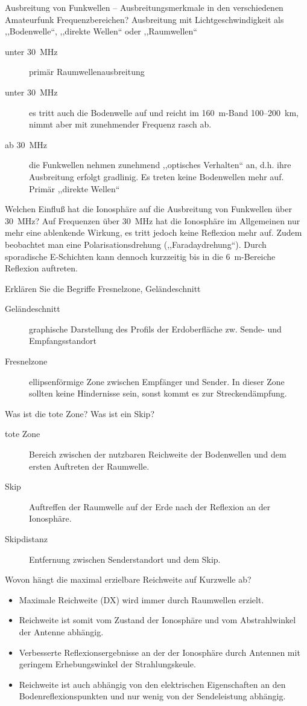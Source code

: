 \documentclass[avery5371,grid,frame,a4paper]{flashcards}
\newcommand{\card}[3]{
  \begin{flashcard}[{\chap} -- #1]{#2}#3\end{flashcard}
}
\begin{document}
\card{13}{Ausbreitung von Funkwellen -- Ausbreitungsmerkmale in den verschiedenen Amateurfunk Frequenzbereichen?}{
  \small
  Ausbreitung mit Lichtgeschwindigkeit als ,,Bodenwelle``, ,,direkte Wellen`` oder ,,Raumwellen``
  \begin{description}
    \item[unter 30~MHz] primär Raumwellenausbreitung
    \item[unter 30~MHz] es tritt auch die Bodenwelle auf und reicht im 160~m-Band 100--200~km, nimmt aber mit zunehmender Frequenz rasch ab.
    \item[ab 30~MHz] die Funkwellen nehmen zunehmend ,,optisches Verhalten`` an, d.h. ihre Ausbreitung erfolgt gradlinig. Es treten keine Bodenwellen mehr auf. Primär ,,direkte Wellen``
  \end{description}
}
\card{14}{Welchen Einfluß hat die Ionosphäre auf die Ausbreitung von Funkwellen über 30~MHz?}{
  Auf Frequenzen über 30~MHz hat die Ionosphäre im Allgemeinen nur mehr eine ablenkende Wirkung, es tritt jedoch keine Reflexion mehr auf. Zudem beobachtet man eine Polarisationsdrehung (,,Faradaydrehung``). Durch sporadische E-Schichten kann dennoch kurzzeitig bis in die 6~m-Bereiche Reflexion auftreten.
}
\card{15}{Erklären Sie die Begriffe Fresnelzone, Geländeschnitt}{
  \begin{description}
  \item[Geländeschnitt] graphische Darstellung des Profils der Erdoberfläche zw. Sende- und Empfangsstandort
  \item[Fresnelzone] ellipsenförmige Zone zwischen Empfänger und Sender. In dieser Zone sollten keine Hindernisse sein, sonst kommt es zur Streckendämpfung.
  \end{description}
}
\card{16}{Was ist die tote Zone? Was ist ein Skip?}{
  \begin{description}
    \item[tote Zone] Bereich zwischen der nutzbaren Reichweite der Bodenwellen und dem ersten Auftreten der Raumwelle.
    \item[Skip] Auftreffen der Raumwelle auf der Erde nach der Reflexion an der Ionosphäre.
    \item[Skipdistanz] Entfernung zwischen Senderstandort und dem Skip.
  \end{description}
}
\card{17}{Wovon hängt die maximal erzielbare Reichweite auf Kurzwelle ab?}{
  \small
  \begin{itemize}
    \item Maximale Reichweite (DX) wird immer durch Raumwellen erzielt.
    \item Reichweite ist somit vom Zustand der Ionosphäre und vom Abstrahlwinkel der Antenne abhängig.
    \item Verbesserte Reflexionsergebnisse an der der Ionosphäre durch Antennen mit geringem Erhebungswinkel der Strahlungskeule.
    \item Reichweite ist auch abhängig von den elektrischen Eigenschaften an den Bodenreflexionspunkten und nur wenig von der Sendeleistung abhängig.
  \end{itemize}
}
\end{document}
